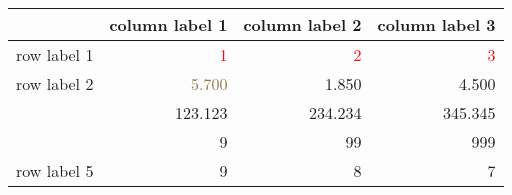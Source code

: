 \begin{tabular}{lrrr} 
\toprule 
  	 & 	 column label 1 	 & 	 column label 2 	 & 	 column label 3 \\ 
\midrule 
row label 1 	 & 	 \textcolor[HTML]{FF0000}{1} 	 & 	 \textcolor[HTML]{FF0000}{2} 	 & 	 \textcolor[HTML]{FF0000}{3} \\ 
row label 2 	 & 	 \textcolor[HTML]{907648}{5.700} 	 & 	 1.850 	 & 	 4.500 \\ 
\cellcolor[HTML]{FFFF00}{row label 3} 	 & 	 123.123 	 & 	 234.234 	 & 	 345.345 \\ 
\cellcolor[HTML]{FF0000}{row label 4} 	 & 	 9 	 & 	 99 	 & 	 999 \\ 
row label 5 	 & 	 9 	 & 	 8 	 & 	 7 \\ 
\bottomrule 
\end{tabular}